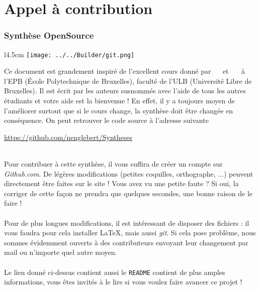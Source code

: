 \chapter*{Appel à contribution}
\subsection*{Synthèse OpenSource}
\begin{wrapfigure}[5]{l}{4.5cm}
	\texttt{[image: ../../Builder/git.png]}
\end{wrapfigure}
Ce document est grandement inspiré de l’excellent cours donné 
par \pprenom~\pnom\	
\ifdefined\spprenom
et\ \spprenom~\spnom\ 
\fi
 à l’EPB (École Polytechnique de Bruxelles), faculté de l’ULB (Université 
Libre de Bruxelles). Il est écrit par les auteurs susnommés avec l’aide de tous les autres étudiants 
et votre aide est la bienvenue ! En effet, il y a toujours moyen de l’améliorer surtout que si le 
cours change, la synthèse doit être changée en conséquence. On peut retrouver le code source à l’adresse 
suivante
\begin{center}
	\url{https://github.com/nenglebert/Syntheses}
\end{center}\ \\
Pour contribuer à cette synthèse, il vous suffira de créer un compte sur \textit{Github.com}. De
légères modifications (petites coquilles, orthographe, ...) peuvent directement être faites sur le
site ! Vous avez vu une petite faute ? Si oui, la corriger de cette façon ne prendra que quelques 
secondes, une bonne raison de le faire ! \\
\\
Pour de plus longues modifications, il est intéressant de disposer des fichiers : il vous 
faudra pour cela installer \LaTeX, mais aussi \textit{git}. Si cela pose problème, nous sommes 
évidemment ouverts à des contributeurs envoyant leur changement par mail ou n’importe quel autre 
moyen.\\
\\
Le lien donné ci-dessus contient aussi le \texttt{README} contient de plus amples informations, 
vous êtes invités à le lire si vous voulez faire avancer ce projet ! 

